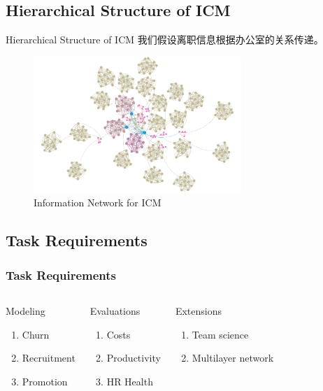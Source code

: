 \documentclass{beamer}
\begin{document}
\begin{CJK*}{UTF8}{gbsn}
\subsection{Hierarchical Structure of ICM}
\begin{frame}{Hierarchical Structure of ICM}
我们假设离职信息根据办公室的关系传递。
\begin{figure}
\centering
\includegraphics[width=0.7\textwidth]{fig/inf-net.png}
\caption{Information Network for ICM}
\end{figure}

\end{frame}

\subsection{Task Requirements}
\begin{frame}
\frametitle{Task Requirements}
\begin{columns}[c]
\begin{block}{Modeling}
\begin{enumerate}
\item Churn
\item Recruitment
\item Promotion
\end{enumerate}
\end{block}
\begin{block}{Evaluations}
\begin{enumerate}
\item Costs
\item Productivity
\item HR Health
\end{enumerate}
\end{block}
\begin{block}{Extensions}
\begin{enumerate}
\item Team science
\item Multilayer network
\end{enumerate}
\end{block}
\end{columns}
\end{frame}



\end{CJK*}
\end{document}

